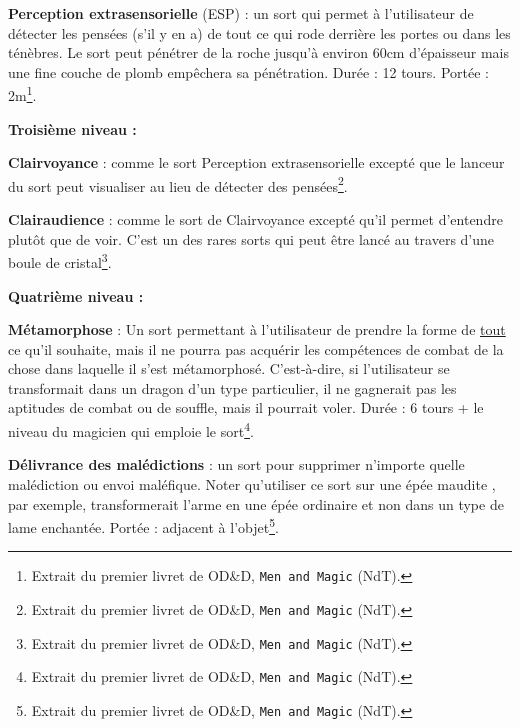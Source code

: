 \bigskip

\label{sort-esp}\textbf{Perception extrasensorielle} (ESP) : un sort qui permet à l'utilisateur de détecter les pensées (s'il y en a) de tout ce qui rode derrière les portes ou dans les ténèbres. Le sort peut pénétrer de la roche jusqu'à environ 60cm d'épaisseur mais une fine couche de plomb empêchera sa pénétration. Durée : 12 tours. Portée : 2m\footnote{Extrait du premier livret de OD\&D, \texttt{Men and Magic} (NdT).}.

\bigskip

\textbf{Troisième niveau :}

\bigskip

\textbf{Clairvoyance} : comme le sort Perception extrasensorielle excepté que le lanceur du sort peut visualiser au lieu de détecter des pensées\footnote{Extrait du premier livret de OD\&D, \texttt{Men and Magic} (NdT).}.

\bigskip

\label{sort-clairaudience}\textbf{Clairaudience} : comme le sort de Clairvoyance excepté qu'il permet d'entendre plutôt que de voir. C'est un des rares sorts qui peut être lancé au travers d'une boule de cristal\footnote{Extrait du premier livret de OD\&D, \texttt{Men and Magic} (NdT).}.

\bigskip

\textbf{Quatrième niveau :}

\bigskip

\label{sort-metamorphose}\textbf{Métamorphose} : Un sort permettant à l'utilisateur de prendre la forme de \underline{tout} ce qu'il souhaite, mais il ne pourra pas acquérir les compétences de combat de la chose dans laquelle il s'est métamorphosé. C'est-à-dire, si l'utilisateur se transformait dans un dragon d'un type particulier, il ne gagnerait pas les aptitudes de combat ou de souffle, mais il pourrait voler. Durée : 6 tours + le niveau du magicien qui emploie le sort\footnote{Extrait du premier livret de OD\&D, \texttt{Men and Magic} (NdT).}.

\bigskip

\label{sort-delivrance-malediction}\textbf{Délivrance des malédictions} : un sort pour supprimer n'importe quelle malédiction ou envoi maléfique. Noter qu'utiliser ce sort sur une \og épée maudite \fg{}, par exemple, transformerait l'arme en une épée ordinaire et non dans un type de lame enchantée. Portée : adjacent à l'objet\footnote{Extrait du premier livret de OD\&D, \texttt{Men and Magic} (NdT).}.

\bigskip


